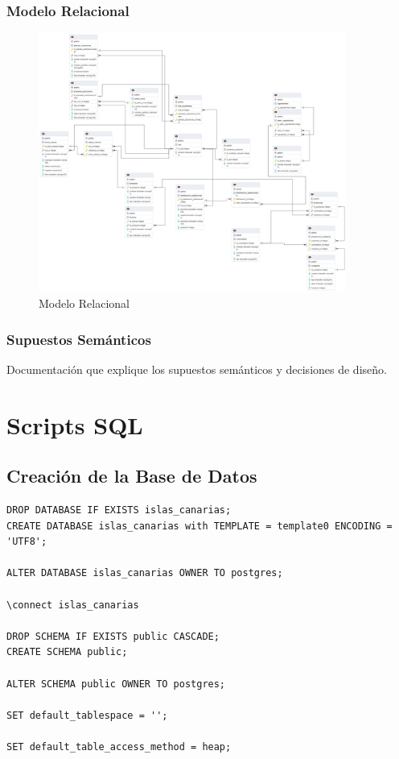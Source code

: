 \documentclass[11pt]{report}
\begin{document}
\subsection{Modelo Relacional}
\begin{figure}[H]
    \centering
    \includegraphics[width=0.9\textwidth]{../diagrams/RELACIONAL.jpg}
    \caption{Modelo Relacional}
    \label{fig:modelo_relacional}
\end{figure}

\subsection{Supuestos Semánticos}
Documentación que explique los supuestos semánticos y decisiones de diseño.

\chapter{Scripts SQL}

\section{Creación de la Base de Datos}
\begin{verbatim}
DROP DATABASE IF EXISTS islas_canarias;
CREATE DATABASE islas_canarias with TEMPLATE = template0 ENCODING = 'UTF8';

ALTER DATABASE islas_canarias OWNER TO postgres;

\connect islas_canarias

DROP SCHEMA IF EXISTS public CASCADE;
CREATE SCHEMA public;

ALTER SCHEMA public OWNER TO postgres;

SET default_tablespace = '';

SET default_table_access_method = heap;
\end{verbatim}
\end{document}
